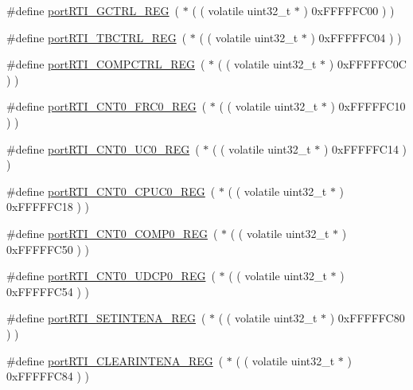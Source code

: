 \begin{DoxyCompactItemize}
\item 
\#define \hyperlink{CCS_2ARM__Cortex-R4_2port_8c_aff46363042cc866d0ba6df9110568cf4}{port\-R\-T\-I\-\_\-\-G\-C\-T\-R\-L\-\_\-\-R\-E\-G}~( $\ast$ ( ( volatile uint32\-\_\-t $\ast$ ) 0x\-F\-F\-F\-F\-F\-C00 ) )
\item 
\#define \hyperlink{CCS_2ARM__Cortex-R4_2port_8c_a4f9bc95664ed4983bb94af37e153c5f2}{port\-R\-T\-I\-\_\-\-T\-B\-C\-T\-R\-L\-\_\-\-R\-E\-G}~( $\ast$ ( ( volatile uint32\-\_\-t $\ast$ ) 0x\-F\-F\-F\-F\-F\-C04 ) )
\item 
\#define \hyperlink{CCS_2ARM__Cortex-R4_2port_8c_ab0142058832463ac15ae49adf0fafecd}{port\-R\-T\-I\-\_\-\-C\-O\-M\-P\-C\-T\-R\-L\-\_\-\-R\-E\-G}~( $\ast$ ( ( volatile uint32\-\_\-t $\ast$ ) 0x\-F\-F\-F\-F\-F\-C0\-C ) )
\item 
\#define \hyperlink{CCS_2ARM__Cortex-R4_2port_8c_a557a48537ec211483665269e918dc94d}{port\-R\-T\-I\-\_\-\-C\-N\-T0\-\_\-\-F\-R\-C0\-\_\-\-R\-E\-G}~( $\ast$ ( ( volatile uint32\-\_\-t $\ast$ ) 0x\-F\-F\-F\-F\-F\-C10 ) )
\item 
\#define \hyperlink{CCS_2ARM__Cortex-R4_2port_8c_ad0e07d8351bedea2f80c1c8d70881053}{port\-R\-T\-I\-\_\-\-C\-N\-T0\-\_\-\-U\-C0\-\_\-\-R\-E\-G}~( $\ast$ ( ( volatile uint32\-\_\-t $\ast$ ) 0x\-F\-F\-F\-F\-F\-C14 ) )
\item 
\#define \hyperlink{CCS_2ARM__Cortex-R4_2port_8c_aa479a6d0eb4c00f8b920df6f5eaee215}{port\-R\-T\-I\-\_\-\-C\-N\-T0\-\_\-\-C\-P\-U\-C0\-\_\-\-R\-E\-G}~( $\ast$ ( ( volatile uint32\-\_\-t $\ast$ ) 0x\-F\-F\-F\-F\-F\-C18 ) )
\item 
\#define \hyperlink{CCS_2ARM__Cortex-R4_2port_8c_af90f6e7888f2ce9acf89e265ab89a50e}{port\-R\-T\-I\-\_\-\-C\-N\-T0\-\_\-\-C\-O\-M\-P0\-\_\-\-R\-E\-G}~( $\ast$ ( ( volatile uint32\-\_\-t $\ast$ ) 0x\-F\-F\-F\-F\-F\-C50 ) )
\item 
\#define \hyperlink{CCS_2ARM__Cortex-R4_2port_8c_a1ebaedc5c82c885e866a008360c7e637}{port\-R\-T\-I\-\_\-\-C\-N\-T0\-\_\-\-U\-D\-C\-P0\-\_\-\-R\-E\-G}~( $\ast$ ( ( volatile uint32\-\_\-t $\ast$ ) 0x\-F\-F\-F\-F\-F\-C54 ) )
\item 
\#define \hyperlink{CCS_2ARM__Cortex-R4_2port_8c_a82bc8ad423f54018e6c6395a464a5676}{port\-R\-T\-I\-\_\-\-S\-E\-T\-I\-N\-T\-E\-N\-A\-\_\-\-R\-E\-G}~( $\ast$ ( ( volatile uint32\-\_\-t $\ast$ ) 0x\-F\-F\-F\-F\-F\-C80 ) )
\item 
\#define \hyperlink{CCS_2ARM__Cortex-R4_2port_8c_a7d7712951ba0e2fa947b5fa4aa8bc1b4}{port\-R\-T\-I\-\_\-\-C\-L\-E\-A\-R\-I\-N\-T\-E\-N\-A\-\_\-\-R\-E\-G}~( $\ast$ ( ( volatile uint32\-\_\-t $\ast$ ) 0x\-F\-F\-F\-F\-F\-C84 ) )

\end{DoxyCompactItemize}
